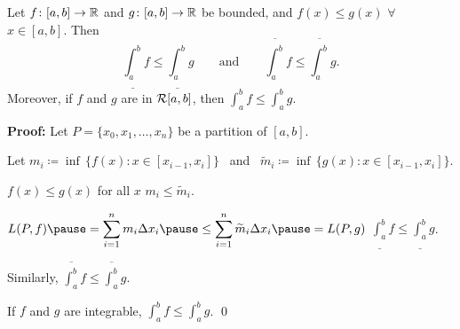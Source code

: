 \documentclass[10pt,aspectratio=169]{beamer}
\begin{document}
\begin{frame}

\begin{proposition}[Monotonicity]
Let $f \colon [a,b] \to {\mathbb{R}}$ and $g \colon [a,b] \to {\mathbb{R}}$ be
bounded, and $f(x) \leq g(x)$
$\forall$ $x \in [a,b]$.
\pause
Then
\begin{equation*}
\underline{\int_a^b} f 
\leq
\underline{\int_a^b} g 
\qquad \text{and} \qquad
\overline{\int_a^b} f 
\leq
\overline{\int_a^b} g .
\end{equation*}
\pause
Moreover, if $f$ and $g$ are in ${\mathcal{R}}[a,b]$, then
$\displaystyle
\int_a^b f 
\leq
\int_a^b g$.
\end{proposition}

\pause
\textbf{Proof:}
Let $P = \{ x_0, x_1, \ldots, x_n \}$ be a partition of $[a,b]$.

\pause
Let
$m_i \coloneqq \inf \, \bigl\{ f(x) : x \in [x_{i-1},x_i] \bigr\}$
~and~
$\widetilde{m}_i \coloneqq \inf \, \bigl\{ g(x) : x \in [x_{i-1},x_i]
\bigr\}$.

\pause
$f(x) \leq g(x)$ for all $x$ \wthus $m_i \leq \widetilde{m}_i$.

\pause
\medskip

$\displaystyle
L(P,f)
\pause
=
\sum_{i=1}^n m_i \Delta x_i
\pause
\leq
\sum_{i=1}^n \widetilde{m}_i \Delta x_i
\pause
=
L(P,g)$
\pause
\wwthus
$\underline{\int_a^b} f 
\leq
\underline{\int_a^b} g$.

\pause
\medskip

Similarly,
$\overline{\int_a^b} f 
\leq
\overline{\int_a^b} g$.

\pause
\medskip

If $f$ and $g$ are integrable, \wthus
$\int_a^b f 
\leq
\int_a^b g$.
\qed

\end{frame}
\end{document}
